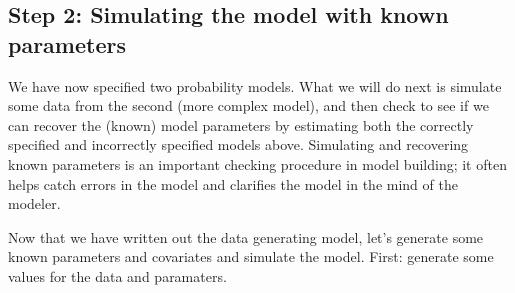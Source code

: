 \documentclass[]{book}
\begin{document}
\subsection{Step 2: Simulating the model with known
parameters}\label{step-2-simulating-the-model-with-known-parameters}

We have now specified two probability models. What we will do next is
simulate some data from the second (more complex model), and then check
to see if we can recover the (known) model parameters by estimating both
the correctly specified and incorrectly specified models above.
Simulating and recovering known parameters is an important checking
procedure in model building; it often helps catch errors in the model
and clarifies the model in the mind of the modeler.

Now that we have written out the data generating model, let's generate
some known parameters and covariates and simulate the model. First:
generate some values for the data and paramaters.
\end{document}
